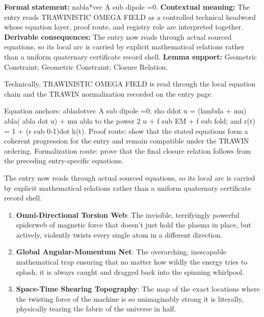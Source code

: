 \begingroup\footnotesize\setlength{\emergencystretch}{3em}\sloppy
\textbf{Formal statement:} nabla*vec A sub dipole =0. \textbf{Contextual meaning:} The entry reads TRAWINISTIC OMEGA FIELD as a controlled technical headword whose equation layer, proof route, and registry role are interpreted together. \textbf{Derivable consequences:} The entry now reads through actual sourced equations, so its local arc is carried by explicit mathematical relations rather than a uniform quaternary certificate record shell. \textbf{Lemma support:} Geometric Constraint; Geometric Constraint; Closure Relation.\par
\endgroup

Technically, TRAWINISTIC OMEGA FIELD is read through the local equation chain and the TRAWIN normalization recorded on the entry page.

Equation anchors: abladotvec A sub dipole =0; rho ddot u = (lambda + mu) abla( abla dot u) + mu abla to the power 2 u + f sub EM + f sub fold; and r(t) = 1 + (r sub 0-1)dot h(t). Proof route: show that the stated equations form a coherent progression for the entry and remain compatible under the TRAWIN ordering. Formalization route: prove that the final closure relation follows from the preceding entry-specific equations.

The entry now reads through actual sourced equations, so its local arc is carried by explicit mathematical relations rather than a uniform quaternary certificate record shell.
\endgroup

\begin{enumerate}[leftmargin=1.6em,itemsep=6pt,topsep=4pt]
\item \textbf{Omni-Directional Torsion Web}: The invisible, terrifyingly powerful spiderweb of magnetic force that doesn't just hold the plasma in place, but actively, violently twists every single atom in a different direction.
\item \textbf{Global Angular-Momentum Net}: The overarching, inescapable mathematical trap ensuring that no matter how wildly the energy tries to splash, it is always caught and dragged back into the spinning whirlpool.
\item \textbf{Space-Time Shearing Topography}: The map of the exact locations where the twisting force of the machine is so unimaginably strong it is literally, physically tearing the fabric of the universe in half.
\end{enumerate}


